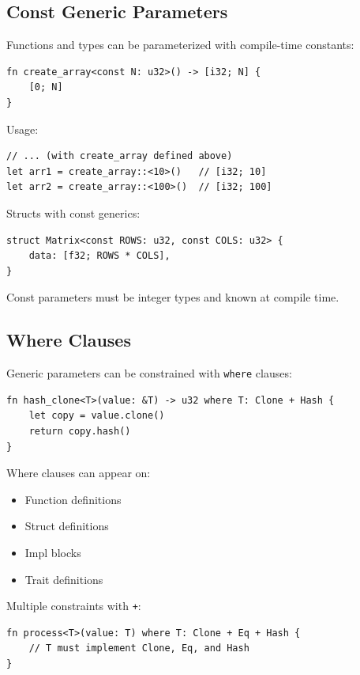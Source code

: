 \subsection{Const Generic Parameters}

Functions and types can be parameterized with compile-time constants:

\begin{lstlisting}
fn create_array<const N: u32>() -> [i32; N] {
    [0; N]
}
\end{lstlisting}

Usage:

\begin{lstlisting}
// ... (with create_array defined above)
let arr1 = create_array::<10>()   // [i32; 10]
let arr2 = create_array::<100>()  // [i32; 100]
\end{lstlisting}

Structs with const generics:

\begin{lstlisting}
struct Matrix<const ROWS: u32, const COLS: u32> {
    data: [f32; ROWS * COLS],
}
\end{lstlisting}

Const parameters must be integer types and known at compile time.

\subsection{Where Clauses}

Generic parameters can be constrained with \texttt{where} clauses:

\begin{lstlisting}
fn hash_clone<T>(value: &T) -> u32 where T: Clone + Hash {
    let copy = value.clone()
    return copy.hash()
}
\end{lstlisting}

Where clauses can appear on:
\begin{itemize}
\item Function definitions
\item Struct definitions
\item Impl blocks
\item Trait definitions
\end{itemize}

Multiple constraints with \texttt{+}:

\begin{lstlisting}
fn process<T>(value: T) where T: Clone + Eq + Hash {
    // T must implement Clone, Eq, and Hash
}
\end{lstlisting}

